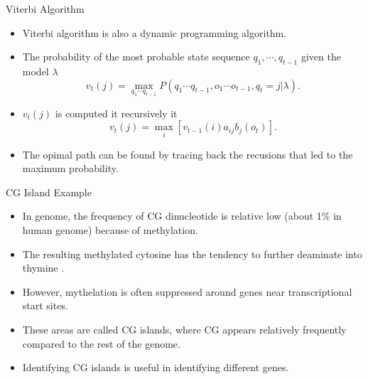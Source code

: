 \documentclass{beamer}
\begin{document}
\begin{frame}{Viterbi Algorithm}
	\begin{itemize}
		\item Viterbi algorithm is also a dynamic programming algorithm.
		\item The probability of the most probable state sequence $q_1, \cdots, q_{t-1}$ given the model $\lambda$
		\begin{equation}
			v_t(j) = \max_{q_1\cdots q_{t-1}} P(q_1\cdots q_{t-1}, o_1\cdots o_{t-1}, q_t = j \vert \lambda).
		\end{equation}
		\item $v_t(j)$ is computed it recursively it 
		\begin{equation}
			v_t(j) = \max_i[v_{t-1}(i) a_{ij} b_j(o_t)].
		\end{equation}
		\item The opimal path can be found by tracing back the recusions that led to the maximum probability.
	\end{itemize}
\end{frame}


\begin{frame}{CG Island Example}
	\begin{itemize}
		\item In genome, the frequency of CG dinucleotide is relative low (about 1\% in human genome) because of methylation. 
		\item The resulting methylated cytosine has the tendency to further deaminate into thymine \cite{compeau2018bioinformatics}.
		\item However, mythelation is often suppressed around genes near transcriptional start sites.
		\item These areas are called CG islands, where CG appears relatively frequently compared to the rest of the genome.
		\item Identifying CG islands is useful in identifying different genes.
	\end{itemize}
\end{frame}
\end{document}
